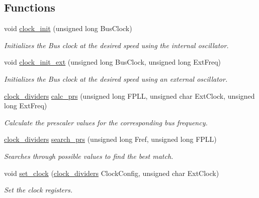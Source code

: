 \subsection*{Functions}
\begin{DoxyCompactItemize}
\item 
void \hyperlink{group___c_p_m_u_gaad29837daff06258028589fec8d69f31}{clock\+\_\+init} (unsigned long Bus\+Clock)
\begin{DoxyCompactList}\small\item\em Initializes the Bus clock at the desired speed using the internal oscillator. \end{DoxyCompactList}\item 
void \hyperlink{group___c_p_m_u_ga6c78aff94957c5e31bca34b4fd427844}{clock\+\_\+init\+\_\+ext} (unsigned long Bus\+Clock, unsigned long Ext\+Freq)
\begin{DoxyCompactList}\small\item\em Initializes the Bus clock at the desired speed using an external oscillator. \end{DoxyCompactList}\item 
\hyperlink{structclock__dividers}{clock\+\_\+dividers} \hyperlink{group___c_p_m_u_gab1ca661150fc5676794ddf0cca50ce8d}{calc\+\_\+prs} (unsigned long F\+P\+L\+L, unsigned char Ext\+Clock, unsigned long Ext\+Freq)
\begin{DoxyCompactList}\small\item\em Calculate the prescaler values for the corresponding bus frequency. \end{DoxyCompactList}\item 
\hyperlink{structclock__dividers}{clock\+\_\+dividers} \hyperlink{group___c_p_m_u_gadfb20c94648c619f69d32ed3920faed0}{search\+\_\+prs} (unsigned long Fref, unsigned long F\+P\+L\+L)
\begin{DoxyCompactList}\small\item\em Searches through possible values to find the best match. \end{DoxyCompactList}\item 
void \hyperlink{group___c_p_m_u_ga97250687e8ce6c1f1c893c93766afe1c}{set\+\_\+clock} (\hyperlink{structclock__dividers}{clock\+\_\+dividers} Clock\+Config, unsigned char Ext\+Clock)
\begin{DoxyCompactList}\small\item\em Set the clock registers. \end{DoxyCompactList}\end{DoxyCompactItemize}


